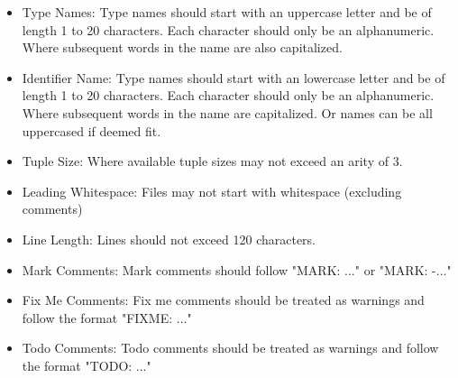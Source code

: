 \documentclass[12pt]{article}
\begin{document}
\begin{itemize}
     \newline
  \item Type Names:\newline
    Type names should start with an uppercase letter and be of length 1 to 20 characters. Each \newline
    character should only be an alphanumeric. Where subsequent words in the name are also  \newline
    capitalized. \newline
     \newline
  \item Identifier Name:\newline
    Type names should start with an lowercase letter and be of length 1 to 20 characters. Each \newline
    character should only be an alphanumeric. Where subsequent words in the name are capitalized. \newline
    Or names can be all uppercased if deemed fit. \newline
     \newline
  \item Tuple Size:\newline
    Where available tuple sizes may not exceed an arity of 3. \newline
     \newline
  \item Leading Whitespace:\newline
    Files may not start with whitespace (excluding comments) \newline
     \newline
  \item Line Length:\newline
    Lines should not exceed 120 characters. \newline
     \newline
  \item Mark Comments:\newline
    Mark comments should follow "MARK: ..." or "MARK: -..." \newline
     \newline
  \item Fix Me Comments:\newline
    Fix me comments should be treated as warnings and follow the format "FIXME: ..." \newline
  \item Todo Comments:\newline
    Todo comments should be treated as warnings and follow the format "TODO: ..." \newline

\end{itemize}
\end{document}
